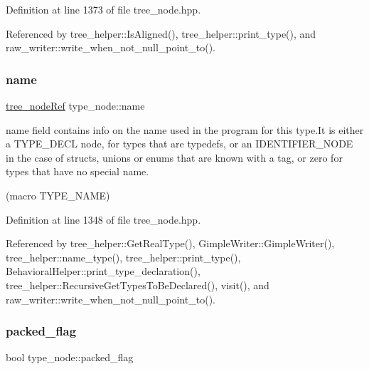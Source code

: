 Definition at line 1373 of file tree\+\_\+node.\+hpp.



Referenced by tree\+\_\+helper\+::\+Is\+Aligned(), tree\+\_\+helper\+::print\+\_\+type(), and raw\+\_\+writer\+::write\+\_\+when\+\_\+not\+\_\+null\+\_\+point\+\_\+to().

\mbox{\label{structtype__node_a07eee969d966f75cb24817bbf90ea34f}} 
\subsubsection{\texorpdfstring{name}{name}}
{\footnotesize\ttfamily \hyperlink{tree__node_8hpp_a6ee377554d1c4871ad66a337eaa67fd5}{tree\+\_\+node\+Ref} type\+\_\+node\+::name}



name field contains info on the name used in the program for this type.\+It is either a T\+Y\+P\+E\+\_\+\+D\+E\+CL node, for types that are typedefs, or an I\+D\+E\+N\+T\+I\+F\+I\+E\+R\+\_\+\+N\+O\+DE in the case of structs, unions or enums that are known with a tag, or zero for types that have no special name. 

(macro T\+Y\+P\+E\+\_\+\+N\+A\+ME) 

Definition at line 1348 of file tree\+\_\+node.\+hpp.



Referenced by tree\+\_\+helper\+::\+Get\+Real\+Type(), Gimple\+Writer\+::\+Gimple\+Writer(), tree\+\_\+helper\+::name\+\_\+type(), tree\+\_\+helper\+::print\+\_\+type(), Behavioral\+Helper\+::print\+\_\+type\+\_\+declaration(), tree\+\_\+helper\+::\+Recursive\+Get\+Types\+To\+Be\+Declared(), visit(), and raw\+\_\+writer\+::write\+\_\+when\+\_\+not\+\_\+null\+\_\+point\+\_\+to().

\mbox{\label{structtype__node_a8af57f9907db6a9d1f8e8a4b90823adf}} 
\subsubsection{\texorpdfstring{packed\+\_\+flag}{packed\_flag}}
{\footnotesize\ttfamily bool type\+\_\+node\+::packed\+\_\+flag}



